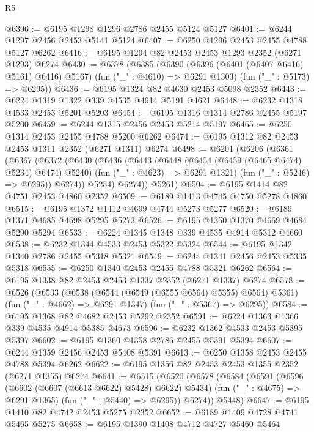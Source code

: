 \begin{lexlean}{R5}
\begin{coremodule}
@6396 := @6195 @1298 @1296 @2786 @2455 @5124 @5127
@6401 := @6244 @1297 @2456 @2453 @5141 @5124
@6407 := @6250 @1296 @2453 @2455 @4788 @5127 @6262
@6416 := @6195 @1294 @82 @2453 @2453 @1293 @2352 (@6271 @1293) @6274
@6430 := @6378
    (@6385
      (@6390 (@6396 (@6401 (@6407 @6416) @5161) @6416) @5167)
      (fun ("_" : @4610) => @6291 @1303)
      (fun ("_" : @5173) => @6295))
@6436 := @6195 @1324 @82 @4630 @2453 @5098 @2352
@6443 := @6224 @1319 @1322 @339 @4535 @4914 @5191 @4621
@6448 := @6232 @1318 @4533 @2453 @5201 @5203
@6454 := @6195 @1316 @1314 @2786 @2455 @5197 @5200
@6459 := @6244 @1315 @2456 @2453 @5214 @5197
@6465 := @6250 @1314 @2453 @2455 @4788 @5200 @6262
@6474 := @6195 @1312 @82 @2453 @2453 @1311 @2352 (@6271 @1311) @6274
@6498 := @6201
    (@6206
      (@6361
        (@6367
          (@6372
            (@6430
              (@6436
                (@6443
                  (@6448 (@6454 (@6459 (@6465 @6474) @5234) @6474) @5240)
                  (fun ("_" : @4623) => @6291 @1321)
                  (fun ("_" : @5246) => @6295))
                @6274))
            @5254)
          @6274))
      @5261)
@6504 := @6195 @1414 @82 @4751 @2453 @4860 @2352
@6509 := @6189 @1413 @4745 @4750 @5278 @4860
@6515 := @6195 @1372 @1412 @4699 @4744 @5273 @5277
@6520 := @6189 @1371 @4685 @4698 @5295 @5273
@6526 := @6195 @1350 @1370 @4669 @4684 @5290 @5294
@6533 := @6224 @1345 @1348 @339 @4535 @4914 @5312 @4660
@6538 := @6232 @1344 @4533 @2453 @5322 @5324
@6544 := @6195 @1342 @1340 @2786 @2455 @5318 @5321
@6549 := @6244 @1341 @2456 @2453 @5335 @5318
@6555 := @6250 @1340 @2453 @2455 @4788 @5321 @6262
@6564 := @6195 @1338 @82 @2453 @2453 @1337 @2352 (@6271 @1337) @6274
@6578 := @6526
    (@6533
      (@6538 (@6544 (@6549 (@6555 @6564) @5355) @6564) @5361)
      (fun ("_" : @4662) => @6291 @1347)
      (fun ("_" : @5367) => @6295))
@6584 := @6195 @1368 @82 @4682 @2453 @5292 @2352
@6591 := @6224 @1363 @1366 @339 @4535 @4914 @5385 @4673
@6596 := @6232 @1362 @4533 @2453 @5395 @5397
@6602 := @6195 @1360 @1358 @2786 @2455 @5391 @5394
@6607 := @6244 @1359 @2456 @2453 @5408 @5391
@6613 := @6250 @1358 @2453 @2455 @4788 @5394 @6262
@6622 := @6195 @1356 @82 @2453 @2453 @1355 @2352 (@6271 @1355) @6274
@6641 := @6515
    (@6520
      (@6578
        (@6584
          (@6591
            (@6596 (@6602 (@6607 (@6613 @6622) @5428) @6622) @5434)
            (fun ("_" : @4675) => @6291 @1365)
            (fun ("_" : @5440) => @6295))
          @6274))
      @5448)
@6647 := @6195 @1410 @82 @4742 @2453 @5275 @2352
@6652 := @6189 @1409 @4728 @4741 @5465 @5275
@6658 := @6195 @1390 @1408 @4712 @4727 @5460 @5464

\end{coremodule}
\end{lexlean}

